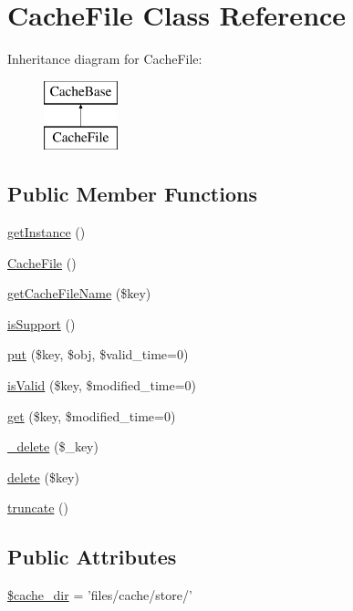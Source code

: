 \hypertarget{classCacheFile}{\section{Cache\+File Class Reference}
\label{classCacheFile}
}
Inheritance diagram for Cache\+File\+:\begin{figure}[H]
\begin{center}
\leavevmode
\includegraphics[height=2.000000cm]{classCacheFile}
\end{center}
\end{figure}
\subsection*{Public Member Functions}
\begin{DoxyCompactItemize}
\item 
\hyperlink{classCacheFile_a5389ea809c31aed387c12eb37b2677b8}{get\+Instance} ()
\item 
\hyperlink{classCacheFile_a989f8b586fb83812f1c0ab1e3f2e302a}{Cache\+File} ()
\item 
\hyperlink{classCacheFile_a15ca23dea98604dc2e6d067f9ce48242}{get\+Cache\+File\+Name} (\$key)
\item 
\hyperlink{classCacheFile_ab3982221be8af4a74302b648831d1376}{is\+Support} ()
\item 
\hyperlink{classCacheFile_a1883472236dececa9215546dae2733cc}{put} (\$key, \$obj, \$valid\+\_\+time=0)
\item 
\hyperlink{classCacheFile_ab154224d403ed4199885414cfa34d713}{is\+Valid} (\$key, \$modified\+\_\+time=0)
\item 
\hyperlink{classCacheFile_aa5834aeb4fce61fe5e99d06fe3795d84}{get} (\$key, \$modified\+\_\+time=0)
\item 
\hyperlink{classCacheFile_a59058fb815de83e25ec107fec5dff2d2}{\+\_\+delete} (\$\+\_\+key)
\item 
\hyperlink{classCacheFile_aae765f3dbe6d888b5e272c247f696518}{delete} (\$key)
\item 
\hyperlink{classCacheFile_a990fc76da2501ced9077aff881350f7f}{truncate} ()
\end{DoxyCompactItemize}
\subsection*{Public Attributes}
\begin{DoxyCompactItemize}
\item 
\hyperlink{classCacheFile_a39d0574a28dd55f6b312811f411f2f51}{\$cache\+\_\+dir} = 'files/cache/store/'
\end{DoxyCompactItemize}


